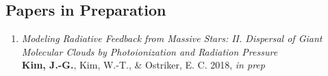 \subsection{Papers in Preparation}
\begin{enumerate}
\item[] \textit{Modeling Radiative Feedback from Massive Stars: II.
    Dispersal of Giant Molecular Clouds by Photoionization and
    Radiation Pressure} \\
  \textbf{Kim, J.-G.}, Kim, W.-T., \& Ostriker, E. C. 2018, \textit{in
    prep}
\end{enumerate}

